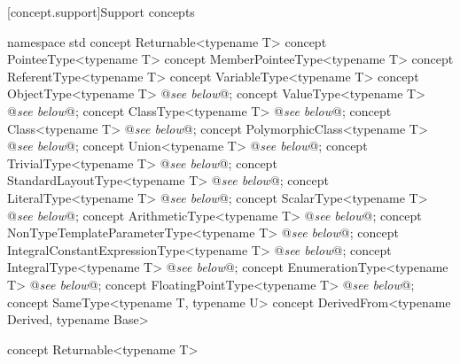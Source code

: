 \documentclass[american]{book}
\begin{document}
\begin{paras}
[concept.support]{Support concepts}

\pnum
{}

\pnum
{}

\begin{codeblock}
namespace std {
  concept Returnable<typename T> { }
  concept PointeeType<typename T> { }
  concept MemberPointeeType<typename T> { }
  concept ReferentType<typename T> { }
  concept VariableType<typename T> { }
  concept ObjectType<typename T> @\textit{see below}@;
  concept ValueType<typename T> @\textit{see below}@;
  concept ClassType<typename T> @\textit{see below}@;
  concept Class<typename T> @\textit{see below}@;
  concept PolymorphicClass<typename T> @\textit{see below}@;
  concept Union<typename T> @\textit{see below}@;
  concept TrivialType<typename T> @\textit{see below}@;
  concept StandardLayoutType<typename T> @\textit{see below}@;
  concept LiteralType<typename T> @\textit{see below}@;
  concept ScalarType<typename T> @\textit{see below}@;
  concept ArithmeticType<typename T> @\textit{see below}@;
  concept NonTypeTemplateParameterType<typename T> @\textit{see below}@;
  concept IntegralConstantExpressionType<typename T> @\textit{see below}@;
  concept IntegralType<typename T> @\textit{see below}@;
  concept EnumerationType<typename T> @\textit{see below}@;
  concept FloatingPointType<typename T> @\textit{see below}@;
  concept SameType<typename T, typename U> {  }
  concept DerivedFrom<typename Derived, typename Base> { }
}
\end{codeblock}

\begin{itemdecl}
concept Returnable<typename T> { }
\end{itemdecl}

\begin{itemdescr}
\pnum
{}

\pnum
{}
\end{itemdescr}


\end{paras}
\end{document}
